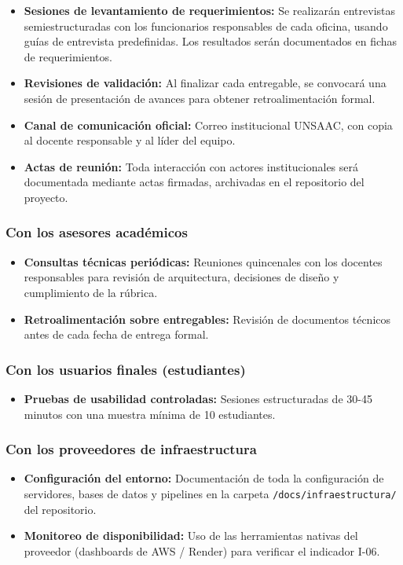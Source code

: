 \begin{itemize}
    \item \textbf{Sesiones de levantamiento de requerimientos:} Se realizarán entrevistas
        semiestructuradas con los funcionarios responsables de cada oficina, usando guías de
        entrevista predefinidas. Los resultados serán documentados en fichas de requerimientos.
    \item \textbf{Revisiones de validación:} Al finalizar cada entregable, se convocará una
        sesión de presentación de avances para obtener retroalimentación formal.
    \item \textbf{Canal de comunicación oficial:} Correo institucional UNSAAC, con copia al
        docente responsable y al líder del equipo.
    \item \textbf{Actas de reunión:} Toda interacción con actores institucionales será
        documentada mediante actas firmadas, archivadas en el repositorio del proyecto.
\end{itemize}

\subsubsection{Con los asesores académicos}

\begin{itemize}
    \item \textbf{Consultas técnicas periódicas:} Reuniones quincenales con los docentes
        responsables para revisión de arquitectura, decisiones de diseño y cumplimiento de la
        rúbrica.
    \item \textbf{Retroalimentación sobre entregables:} Revisión de documentos técnicos antes de
        cada fecha de entrega formal.
\end{itemize}

\subsubsection{Con los usuarios finales (estudiantes)}

\begin{itemize}
    \item \textbf{Pruebas de usabilidad controladas:} Sesiones estructuradas de 30-45 minutos
        con una muestra mínima de 10 estudiantes.
\end{itemize}

\subsubsection{Con los proveedores de infraestructura}

\begin{itemize}
    \item \textbf{Configuración del entorno:} Documentación de toda la configuración de
        servidores, bases de datos y pipelines en la carpeta \texttt{/docs/infraestructura/} del
        repositorio.
    \item \textbf{Monitoreo de disponibilidad:} Uso de las herramientas nativas del proveedor
        (dashboards de AWS / Render) para verificar el indicador I-06.
\end{itemize}